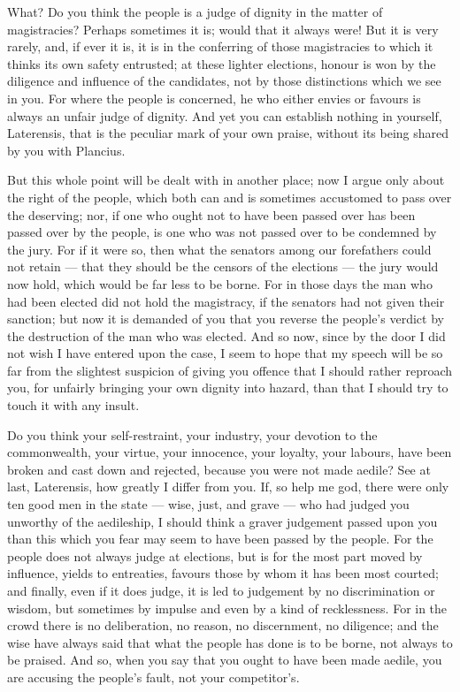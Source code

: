  What? Do you think the people is a judge of dignity in the matter of magistracies? Perhaps sometimes it is; would that it always were! But it is very rarely, and, if ever it is, it is in the conferring of those magistracies to which it thinks its own safety entrusted; at these lighter elections, honour is won by the diligence and influence of the candidates, not by those distinctions which we see in you. For where the people is concerned, he who either envies or favours is always an unfair judge of dignity. And yet you can establish nothing in yourself, Laterensis, that is the peculiar mark of your own praise, without its being shared by you with Plancius.

 But this whole point will be dealt with in another place; now I argue only about the right of the people, which both can and is sometimes accustomed to pass over the deserving; nor, if one who ought not to have been passed over has been passed over by the people, is one who was not passed over to be condemned by the jury. For if it were so, then what the senators among our forefathers could not retain --- that they should be the censors of the elections --- the jury would now hold, which would be far less to be borne. For in those days the man who had been elected did not hold the magistracy, if the senators had not given their sanction; but now it is demanded of you that you reverse the people's verdict by the destruction of the man who was elected. And so now, since by the door I did not wish I have entered upon the case, I seem to hope that my speech will be so far from the slightest suspicion of giving you offence that I should rather reproach you, for unfairly bringing your own dignity into hazard, than that I should try to touch it with any insult.

 Do you think your self-restraint, your industry, your devotion to the commonwealth, your virtue, your innocence, your loyalty, your labours, have been broken and cast down and rejected, because you were not made aedile? See at last, Laterensis, how greatly I differ from you. If, so help me god, there were only ten good men in the state --- wise, just, and grave --- who had judged you unworthy of the aedileship, I should think a graver judgement passed upon you than this which you fear may seem to have been passed by the people. For the people does not always judge at elections, but is for the most part moved by influence, yields to entreaties, favours those by whom it has been most courted; and finally, even if it does judge, it is led to judgement by no discrimination or wisdom, but sometimes by impulse and even by a kind of recklessness. For in the crowd there is no deliberation, no reason, no discernment, no diligence; and the wise have always said that what the people has done is to be borne, not always to be praised. And so, when you say that you ought to have been made aedile, you are accusing the people's fault, not your competitor's.

